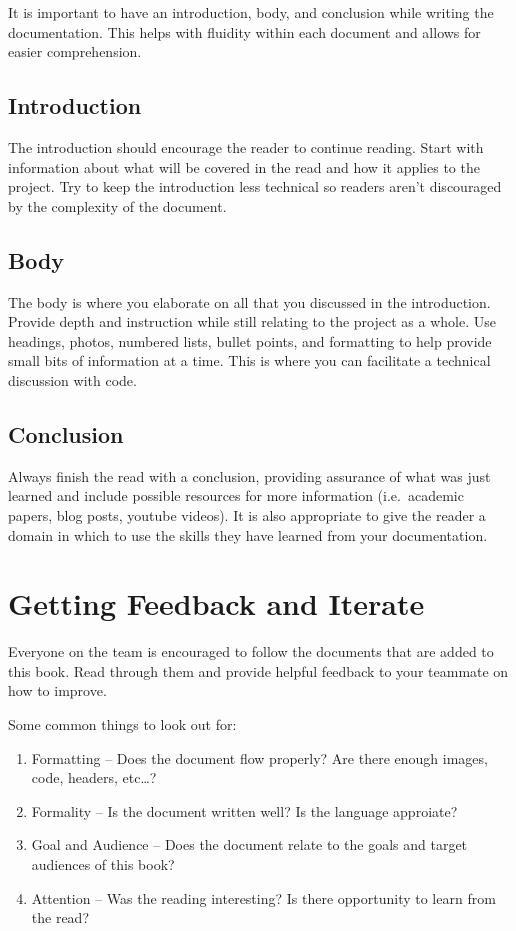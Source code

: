 \documentclass[]{book}
\begin{document}
It is important to have an introduction, body, and conclusion while
writing the documentation. This helps with fluidity within each document
and allows for easier comprehension.

\subsection{Introduction}\label{introduction}

The introduction should encourage the reader to continue reading. Start
with information about what will be covered in the read and how it
applies to the project. Try to keep the introduction less technical so
readers aren't discouraged by the complexity of the document.

\subsection{Body}\label{body}

The body is where you elaborate on all that you discussed in the
introduction. Provide depth and instruction while still relating to the
project as a whole. Use headings, photos, numbered lists, bullet points,
and formatting to help provide small bits of information at a time. This
is where you can facilitate a technical discussion with code.

\subsection{Conclusion}\label{conclusion}

Always finish the read with a conclusion, providing assurance of what
was just learned and include possible resources for more information
(i.e.~academic papers, blog posts, youtube videos). It is also
appropriate to give the reader a domain in which to use the skills they
have learned from your documentation.

\section{Getting Feedback and
Iterate}\label{getting-feedback-and-iterate}

Everyone on the team is encouraged to follow the documents that are
added to this book. Read through them and provide helpful feedback to
your teammate on how to improve.

Some common things to look out for:

\begin{enumerate}
\def\labelenumi{\arabic{enumi}.}
\item
  Formatting -- Does the document flow properly? Are there enough
  images, code, headers, etc\ldots{}?
\item
  Formality -- Is the document written well? Is the language approiate?
\item
  Goal and Audience -- Does the document relate to the goals and target
  audiences of this book?
\item
  Attention -- Was the reading interesting? Is there opportunity to
  learn from the read?
\end{enumerate}
\end{document}

